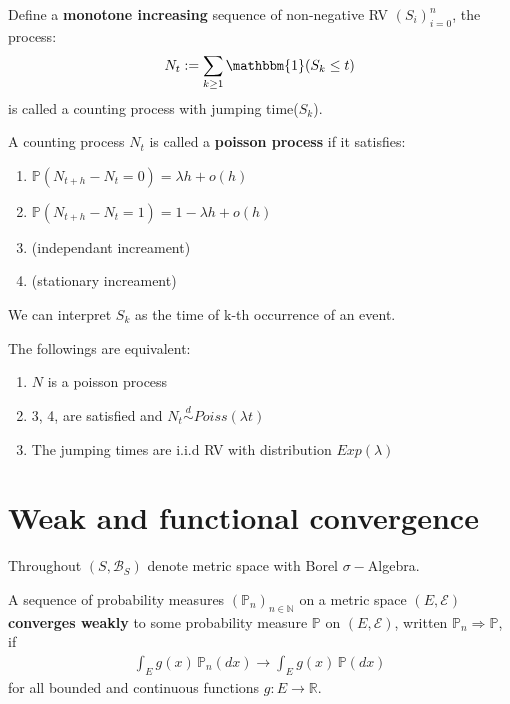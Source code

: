 \begin{definition}
	Define a \textbf{monotone increasing} sequence of non-negative RV $(S_i)_{i = 0}^{n}$, the process:
	\begin{equation*}
		N_t: = \sum_{k \geq 1} \mathbbm{1}(S_k \leq t)
	\end{equation*}
	is called a counting process with jumping time($S_k$).
\end{definition}

\begin{definition}
A counting process $N_t$ is called a \textbf{poisson process} if it satisfies:
\begin{enumerate}
	\item $\mathbb{P}(N_{t + h} - N_t = 0) = \lambda h + o(h)$
	\item $\mathbb{P}(N_{t + h} - N_t = 1) = 1 - \lambda h + o(h)$
	\item (independant increament)
	\item (stationary increament)
\end{enumerate} 
\end{definition}
\begin{remark}
We can interpret $S_k$ as the time of k-th occurrence of an event. 	
\end{remark}


\begin{theorem}
	The followings are equivalent:
	\begin{enumerate}
		\item $N$ is a poisson process
		\item 3, 4, are satisfied and $N_t \overset{d}{\sim} Poiss(\lambda t)$
		\item The jumping times are i.i.d RV with distribution $Exp(\lambda)$
	\end{enumerate}
\end{theorem}



\newpage
\section{Weak and functional convergence}
Throughout $(S, \mathcal{B}_S)$ denote metric space with Borel $\sigma-$Algebra.

\begin{definition}
	A sequence of probability measures $(\mathbb{P}_n)_{n \in \mathbb{N}}$ on a metric space $(E, \mathcal{E})$ \textbf{converges weakly} to some probability measure $\mathbb{P}$ on $(E, \mathcal{E})$, written $\mathbb{P}_n \Rightarrow \mathbb{P}$, if
	\begin{align*}
		\int_E g(x)\, \mathbb{P}_n(dx) \rightarrow \int_E g(x)\, \mathbb{P}(dx)
	\end{align*}
	for all bounded and continuous functions $g: E \rightarrow \mathbb{R}$.
\end{definition} 

